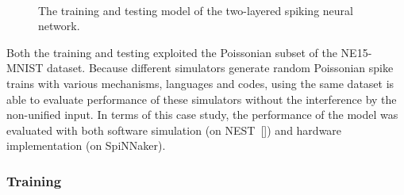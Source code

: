 \begin{figure}[hbt!]
	\centering
	 \\

	\centering
	
		
	\caption{The training and testing model of the two-layered spiking neural network.}
	\label{fig:model}
\end{figure} 



Both the training and testing exploited the Poissonian subset of the NE15-MNIST dataset.
Because different simulators generate random Poissonian spike trains with various mechanisms, languages and codes, using the same dataset is able to evaluate performance of these simulators without the interference by the non-unified input.
In terms of this case study, the performance of the model was evaluated with both software simulation (on NEST~[\cite{gewaltig2007nest}]) and hardware implementation (on SpiNNaker). 

\subsubsection{Training}

